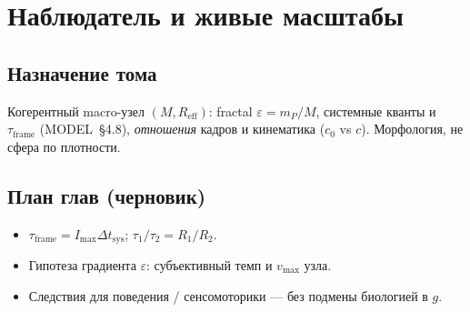\part{Наблюдатель и живые масштабы}

\chapter{Назначение тома}
Когерентный macro-узел $(M, R_{\mathrm{eff}})$: fractal $\varepsilon = m_P/M$,
системные кванты и $\tau_{\mathrm{frame}}$ (MODEL~\S4.8), \emph{отношения} кадров
и кинематика ($c_0$ vs $c$). Морфология, не сфера по плотности.

\chapter{План глав (черновик)}
\begin{itemize}
  \item $\tau_{\mathrm{frame}} = I_{\max}\Delta t_{\mathrm{sys}}$; $\tau_1/\tau_2 = R_1/R_2$.
  \item Гипотеза градиента $\varepsilon$: субъективный темп и $v_{\max}$ узла.
  \item Следствия для поведения / сенсомоторики --- без подмены биологией в $g$.
\end{itemize}
